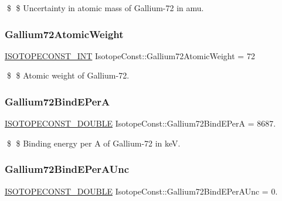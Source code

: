 \$ \$ Uncertainty in atomic mass of Gallium-\/72 in amu. \mbox{\label{group___isotope_const-_gallium-_ga72_gac66aa4c985c183c35af0f15fc7dbae80}} 
\subsubsection{\texorpdfstring{Gallium72\+Atomic\+Weight}{Gallium72AtomicWeight}}
{\footnotesize\ttfamily \mbox{\hyperlink{group___isotope_const-_macros_ga5f18360b3e99483a35c32d789e62621c}{I\+S\+O\+T\+O\+P\+E\+C\+O\+N\+S\+T\+\_\+\+I\+NT}} Isotope\+Const\+::\+Gallium72\+Atomic\+Weight = 72}

\$ \$ Atomic weight of Gallium-\/72. \mbox{\label{group___isotope_const-_gallium-_ga72_gaacedd726eb832f7f9d0ecd1905cebc26}} 
\subsubsection{\texorpdfstring{Gallium72\+Bind\+E\+PerA}{Gallium72BindEPerA}}
{\footnotesize\ttfamily \mbox{\hyperlink{group___isotope_const-_macros_ga8f45a7272ce02c0b4c65c44636ed719a}{I\+S\+O\+T\+O\+P\+E\+C\+O\+N\+S\+T\+\_\+\+D\+O\+U\+B\+LE}} Isotope\+Const\+::\+Gallium72\+Bind\+E\+PerA = 8687.}

\$ \$ Binding energy per A of Gallium-\/72 in keV. \mbox{\label{group___isotope_const-_gallium-_ga72_ga3d2951901e46637d2fcfa5072ecf983c}} 
\subsubsection{\texorpdfstring{Gallium72\+Bind\+E\+Per\+A\+Unc}{Gallium72BindEPerAUnc}}
{\footnotesize\ttfamily \mbox{\hyperlink{group___isotope_const-_macros_ga8f45a7272ce02c0b4c65c44636ed719a}{I\+S\+O\+T\+O\+P\+E\+C\+O\+N\+S\+T\+\_\+\+D\+O\+U\+B\+LE}} Isotope\+Const\+::\+Gallium72\+Bind\+E\+Per\+A\+Unc = 0.}

